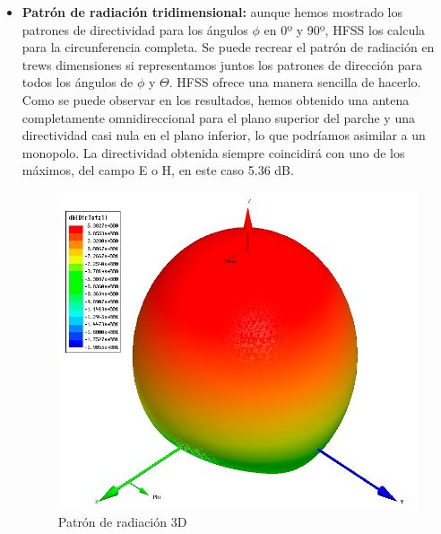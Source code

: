 \begin{itemize}
\item \textbf{Patrón de radiación tridimensional: }aunque hemos mostrado los patrones de directividad para los ángulos $\phi $ en 0º y 90º, HFSS los calcula para la circunferencia completa. Se puede recrear el patrón de radiación en trews dimensiones si representamos juntos los patrones de dirección para todos los ángulos de $\phi$ y $\Theta$. HFSS ofrece una manera sencilla de hacerlo. Como se puede observar en los resultados, hemos obtenido una antena completamente omnidireccional para el plano superior del parche y una directividad casi nula en el plano inferior, lo que podríamos asimilar a un monopolo. La directividad obtenida siempre coincidirá con uno de los máximos, del campo E o H, en este caso 5.36 dB.
	\begin{figure}[H]
    \centering
        \includegraphics[width=\textwidth]{archivos/analisis/1x11/6}
        \caption{Patrón de radiación 3D}
        \label{fig:rad3d}
	\end{figure}
	

\end{itemize}
